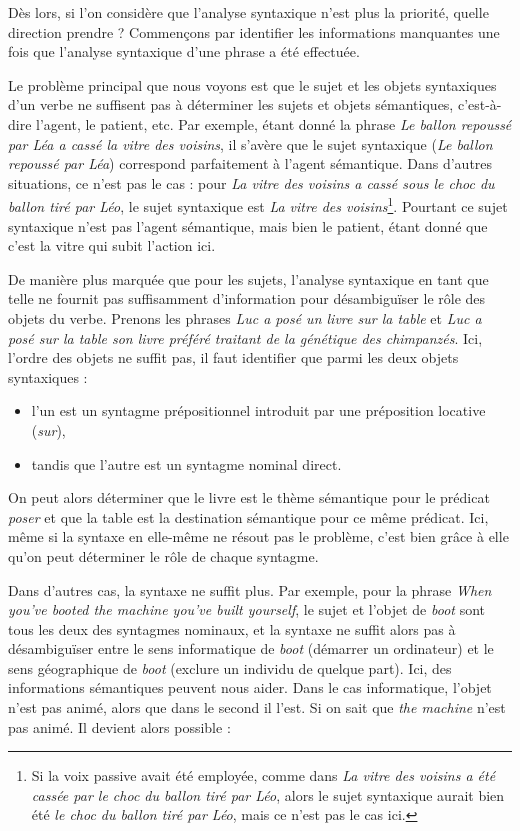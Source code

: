 Dès lors, si l'on considère que l'analyse syntaxique n'est plus la priorité,
quelle direction prendre ? Commençons par identifier les informations
manquantes une fois que l'analyse syntaxique d'une phrase a été effectuée.

Le problème principal que nous voyons est que le sujet et les objets
syntaxiques d'un verbe ne suffisent pas à déterminer les sujets et objets
sémantiques, c'est-à-dire l'agent, le patient, etc. Par exemple, étant donné la
phrase \textit{Le ballon repoussé par Léa a cassé la vitre des voisins}, il
s'avère que le sujet syntaxique (\textit{Le ballon repoussé par Léa})
correspond parfaitement à l'agent sémantique.  Dans d'autres situations, ce
n'est pas le cas : pour \textit{La vitre des voisins a cassé sous le choc du
ballon tiré par Léo}, le sujet syntaxique est \textit{La vitre des
voisins}\footnote{Si la voix passive avait été employée, comme dans \textit{La
    vitre des voisins a été cassée par le choc du ballon tiré par Léo}, alors
le sujet syntaxique aurait bien été \textit{le choc du ballon tiré par Léo},
mais ce n'est pas le cas ici.}. Pourtant ce sujet syntaxique n'est pas l'agent
sémantique, mais bien le patient, étant donné que c'est la vitre qui subit
l'action ici.

De manière plus marquée que pour les sujets, l'analyse syntaxique en tant que
telle ne fournit pas suffisamment d'information pour désambiguïser le rôle des
objets du verbe.  Prenons les phrases \textit{Luc a posé un livre sur la table}
et \textit{Luc a posé sur la table son livre préféré traitant de la génétique des
chimpanzés}.  Ici, l'ordre des objets ne suffit pas, il faut identifier que
parmi les deux objets syntaxiques :

\begin{itemize}
    \item l'un est un syntagme prépositionnel introduit par une préposition
        locative (\textit{sur}),
    \item tandis que l'autre est un syntagme nominal direct.
\end{itemize}

On peut alors déterminer que le livre est le thème sémantique pour le prédicat
\textit{poser} et que la table est la destination sémantique pour ce même
prédicat. Ici, même si la syntaxe en elle-même ne résout pas le problème, c'est
bien grâce à elle qu'on peut déterminer le rôle de chaque syntagme.

Dans d'autres cas, la syntaxe ne suffit plus. Par exemple, pour la phrase
\textit{When you've booted the machine you've built yourself}, le sujet et
l'objet de \textit{boot} sont tous les deux des syntagmes nominaux, et la
syntaxe ne suffit alors pas à désambiguïser entre le sens informatique de
\textit{boot} (démarrer un ordinateur) et le sens géographique de \textit{boot}
(exclure un individu de quelque part). Ici, des informations sémantiques
peuvent nous aider. Dans le cas informatique, l'objet n'est pas animé, alors
que dans le second il l'est. Si on sait que \textit{the machine} n'est pas
animé. Il devient alors possible :

